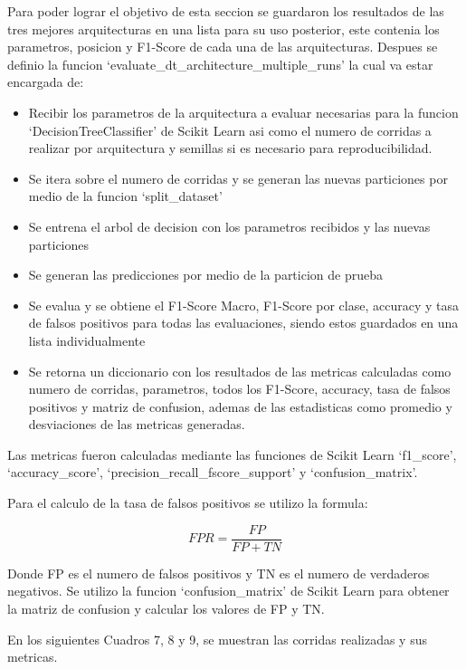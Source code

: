 \documentclass[12pt,a4paper]{article}
\begin{document}
Para poder lograr el objetivo de esta seccion se guardaron los resultados de las tres mejores arquitecturas
en una lista para su uso posterior, este contenia los parametros, posicion y F1-Score de cada una de las arquitecturas.
Despues se definio la funcion `evaluate_dt_architecture_multiple_runs' la cual va estar encargada de:

\begin{itemize}
  \item Recibir los parametros de la arquitectura a evaluar necesarias para la funcion `DecisionTreeClassifier' de Scikit Learn
    asi como el numero de corridas a realizar por arquitectura y semillas si es necesario para reproducibilidad.
  \item Se itera sobre el numero de corridas y se generan las nuevas particiones por medio de la funcion `split_dataset'
  \item Se entrena el arbol de decision con los parametros recibidos y las nuevas particiones
  \item Se generan las predicciones por medio de la particion de prueba
  \item Se evalua y se obtiene el F1-Score Macro, F1-Score por clase, accuracy y
    tasa de falsos positivos para todas las evaluaciones, siendo estos
    guardados en una lista individualmente
  \item Se retorna un diccionario con los resultados de las metricas calculadas como
    numero de corridas, parametros, todos los F1-Score, accuracy, tasa de falsos positivos y matriz de confusion,
    ademas de las estadisticas como promedio y desviaciones de las metricas generadas.
\end{itemize}

Las metricas fueron calculadas mediante las funciones de Scikit Learn `f1_score', `accuracy_score', `precision_recall_fscore_support' y `confusion_matrix'.

Para el calculo de la tasa de falsos positivos se utilizo la formula:

\[
  FPR = \frac{FP}{FP + TN}
\]

Donde FP es el numero de falsos positivos y TN es el numero de verdaderos negativos.
Se utilizo la funcion `confusion_matrix' de Scikit Learn para obtener
la matriz de confusion y calcular los valores de FP y TN.

En los siguientes Cuadros 7, 8 y 9, se muestran las corridas realizadas y sus metricas.
\end{document}
